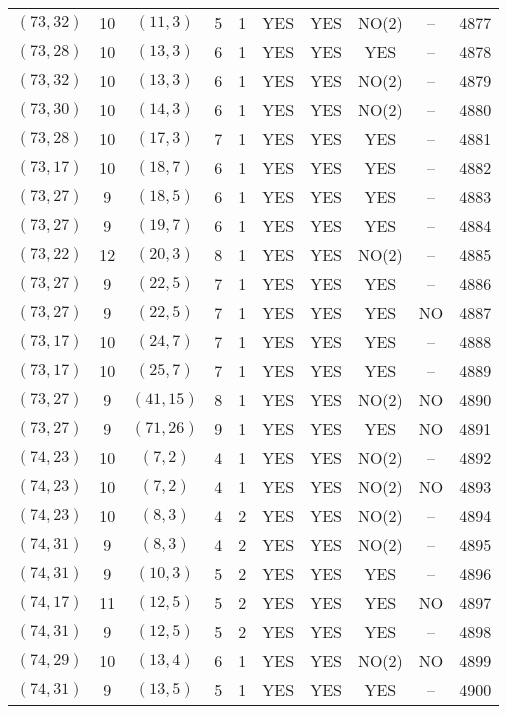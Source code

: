 \begin{longtable}{|c|c|c|c|c|c|c|c|c|c|}
$(73, 32)$ & 10 & $(11, 3)$ & 5 & 1 & YES & YES & NO(2) & -- & 4877\\
$(73, 28)$ & 10 & $(13, 3)$ & 6 & 1 & YES & YES & YES & -- & 4878\\
$(73, 32)$ & 10 & $(13, 3)$ & 6 & 1 & YES & YES & NO(2) & -- & 4879\\
$(73, 30)$ & 10 & $(14, 3)$ & 6 & 1 & YES & YES & NO(2) & -- & 4880\\
$(73, 28)$ & 10 & $(17, 3)$ & 7 & 1 & YES & YES & YES & -- & 4881\\
$(73, 17)$ & 10 & $(18, 7)$ & 6 & 1 & YES & YES & YES & -- & 4882\\
$(73, 27)$ & 9 & $(18, 5)$ & 6 & 1 & YES & YES & YES & -- & 4883\\
$(73, 27)$ & 9 & $(19, 7)$ & 6 & 1 & YES & YES & YES & -- & 4884\\
$(73, 22)$ & 12 & $(20, 3)$ & 8 & 1 & YES & YES & NO(2) & -- & 4885\\
$(73, 27)$ & 9 & $(22, 5)$ & 7 & 1 & YES & YES & YES & -- & 4886\\
$(73, 27)$ & 9 & $(22, 5)$ & 7 & 1 & YES & YES & YES & NO & 4887\\
$(73, 17)$ & 10 & $(24, 7)$ & 7 & 1 & YES & YES & YES & -- & 4888\\
$(73, 17)$ & 10 & $(25, 7)$ & 7 & 1 & YES & YES & YES & -- & 4889\\
$(73, 27)$ & 9 & $(41, 15)$ & 8 & 1 & YES & YES & NO(2) & NO & 4890\\
$(73, 27)$ & 9 & $(71, 26)$ & 9 & 1 & YES & YES & YES & NO & 4891\\
$(74, 23)$ & 10 & $(7, 2)$ & 4 & 1 & YES & YES & NO(2) & -- & 4892\\
$(74, 23)$ & 10 & $(7, 2)$ & 4 & 1 & YES & YES & NO(2) & NO & 4893\\
$(74, 23)$ & 10 & $(8, 3)$ & 4 & 2 & YES & YES & NO(2) & -- & 4894\\
$(74, 31)$ & 9 & $(8, 3)$ & 4 & 2 & YES & YES & NO(2) & -- & 4895\\
$(74, 31)$ & 9 & $(10, 3)$ & 5 & 2 & YES & YES & YES & -- & 4896\\
$(74, 17)$ & 11 & $(12, 5)$ & 5 & 2 & YES & YES & YES & NO & 4897\\
$(74, 31)$ & 9 & $(12, 5)$ & 5 & 2 & YES & YES & YES & -- & 4898\\
$(74, 29)$ & 10 & $(13, 4)$ & 6 & 1 & YES & YES & NO(2) & NO & 4899\\
$(74, 31)$ & 9 & $(13, 5)$ & 5 & 1 & YES & YES & YES & -- & 4900\\

\end{longtable}
